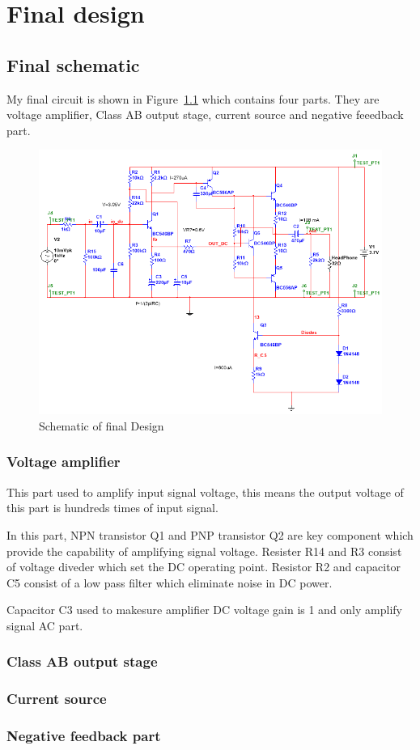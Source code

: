 \chapter{Final design}

\section{Final schematic}

My final circuit is shown in Figure~\ref{fig:final schematic} which contains four parts. They are voltage amplifier, Class AB output stage, current source and negative feeedback part.



\begin{figure}[htbp]
	\centering
	\includegraphics[scale=0.7]{"../Photo/Chap5/final schematic"}
	\caption{Schematic of final Design }
	\label{fig:final schematic}
\end{figure}


\subsection{Voltage amplifier}  

This part used to amplify input signal voltage, this means the output voltage of this part is hundreds times of input signal.


In this part, NPN transistor Q1 and PNP transistor Q2 are key component which provide the capability of amplifying signal voltage. Resister R14 and R3 consist of voltage diveder which set the DC operating point. Resistor R2 and capacitor C5 consist of a low pass filter which eliminate noise in DC power.

Capacitor C3 used to makesure amplifier DC voltage gain is 1 and only amplify signal AC part.


\subsection{Class AB output stage}  



\subsection{Current source }  



\subsection{Negative feedback part} 